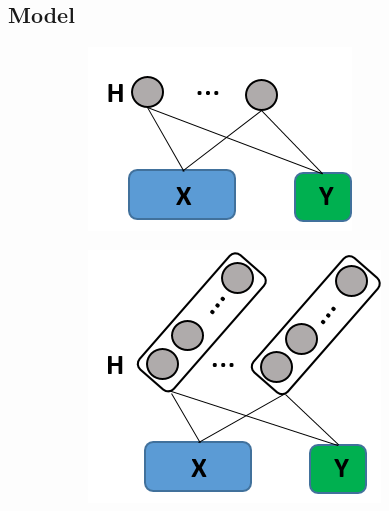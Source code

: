 \documentclass[review]{elsarticle}
\begin{document}
\subsection{Model}
\begin{figure}[ht]
  \centering
  \begin{subfigure}[b]{0.45\textwidth}
    \includegraphics[scale=1]{crbm.png}
  \end{subfigure}
  \begin{subfigure}[b]{0.45\textwidth}
    \includegraphics[scale=1]{gcrbm.png}
  \end{subfigure}
\end{figure}
\end{document}
